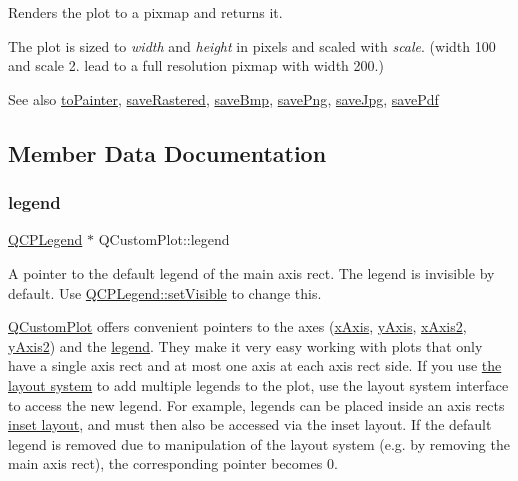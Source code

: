 Renders the plot to a pixmap and returns it.

The plot is sized to {\itshape width} and {\itshape height} in pixels and scaled with {\itshape scale}. (width 100 and scale 2. lead to a full resolution pixmap with width 200.)

\begin{DoxySeeAlso}{See also}
\hyperlink{classQCustomPlot_a1be68d5c0f1e086d6374d1340a193fb9}{to\+Painter}, \hyperlink{classQCustomPlot_ad7723ce2edfa270632ef42b03a444352}{save\+Rastered}, \hyperlink{classQCustomPlot_ae3a86ed0795670e50afa21759d4fa13d}{save\+Bmp}, \hyperlink{classQCustomPlot_ac92cc9256d12f354b40a4be4600b5fb9}{save\+Png}, \hyperlink{classQCustomPlot_a76f0d278e630a711fa6f48048cfd83e4}{save\+Jpg}, \hyperlink{classQCustomPlot_ad5acd34f6b39c3516887d7e54fec2412}{save\+Pdf} 
\end{DoxySeeAlso}


\subsection{Member Data Documentation}
\mbox{\label{classQCustomPlot_a4eadcd237dc6a09938b68b16877fa6af}} 
\subsubsection{\texorpdfstring{legend}{legend}}
{\footnotesize\ttfamily \hyperlink{classQCPLegend}{Q\+C\+P\+Legend} $\ast$ Q\+Custom\+Plot\+::legend}

A pointer to the default legend of the main axis rect. The legend is invisible by default. Use \hyperlink{classQCPLayerable_a3bed99ddc396b48ce3ebfdc0418744f8}{Q\+C\+P\+Legend\+::set\+Visible} to change this.

\hyperlink{classQCustomPlot}{Q\+Custom\+Plot} offers convenient pointers to the axes (\hyperlink{classQCustomPlot_a9a79cd0158a4c7f30cbc702f0fd800e4}{x\+Axis}, \hyperlink{classQCustomPlot_af6fea5679725b152c14facd920b19367}{y\+Axis}, \hyperlink{classQCustomPlot_ada41599f22cad901c030f3dcbdd82fd9}{x\+Axis2}, \hyperlink{classQCustomPlot_af13fdc5bce7d0fabd640f13ba805c0b7}{y\+Axis2}) and the \hyperlink{classQCustomPlot_a4eadcd237dc6a09938b68b16877fa6af}{legend}. They make it very easy working with plots that only have a single axis rect and at most one axis at each axis rect side. If you use \hyperlink{}{the layout system} to add multiple legends to the plot, use the layout system interface to access the new legend. For example, legends can be placed inside an axis rect\textquotesingle{}s \hyperlink{classQCPAxisRect_a949f803466619924c7018df4b511ae10}{inset layout}, and must then also be accessed via the inset layout. If the default legend is removed due to manipulation of the layout system (e.\+g. by removing the main axis rect), the corresponding pointer becomes 0.


